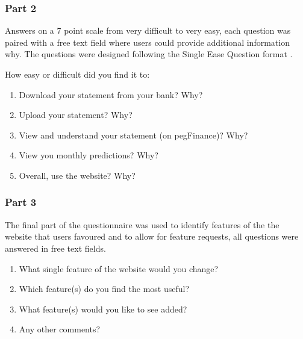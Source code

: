 \begin{appendices}
\subsubsection{Part 2}
Answers on a 7 point scale from very difficult to very easy, each question was paired with a free text field where users could provide additional information why. The questions were designed following the Single Ease Question format \parencite{sauro2009comparison}. 

\noindent
How easy or difficult did you find it to:
\begin{enumerate}
\item Download your statement from your bank? Why?
\item Upload your statement? Why?
\item View and understand your statement (on pegFinance)? Why?	\item View you monthly predictions?	Why?
\item Overall, use the website?	Why?
\end{enumerate}

\subsubsection{Part 3}
The final part of the questionnaire was used to identify features of the the website that users favoured and to allow for feature requests, all questions were answered in free text fields. 

\begin{enumerate}
\item What single feature of the website would you change?
\item Which feature(s) do you find the most useful?
\item What feature(s) would you like to see added?
\item Any other comments?
\end{enumerate}

\end{appendices}
